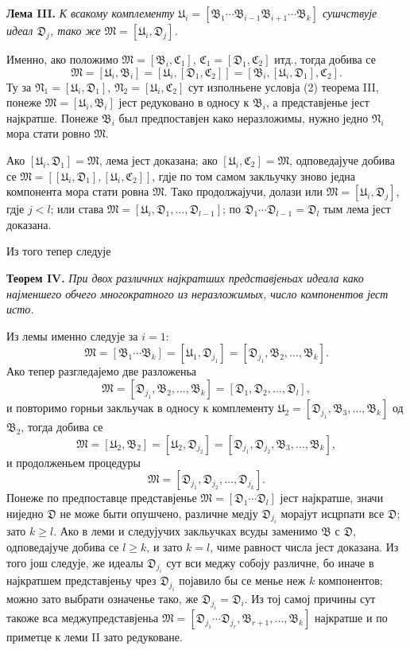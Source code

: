 ﻿\documentclass[11pt]{article}
\newcommand{\ideal}[1]{\mathfrak{#1}}
\begin{document}
\textbf{Лема III.} \emph{К всакому комплементу \(\ideal U_i=[\ideal B_1\cdots\ideal B_{i-1}\ideal B_{i+1}\cdots\ideal B_k]\) сушчствује идеал \(\ideal D_j\), тако же \(\ideal M=[\ideal U_i,\ideal D_j]\).}

Именно, ако положимо \(\ideal M=[\ideal B_i,\ideal C_1]\), \(\ideal C_1=[\ideal D_1,\ideal C_2]\) итд., тогда добива се
\[
 \ideal M=[\ideal U_i,\ideal B_i]=[\ideal U_i,[\ideal D_1,\ideal C_2]]=[\ideal B_i,[\ideal U_i,\ideal D_1],\ideal C_2].
\]
Ту за \(\ideal N_1=[\ideal U_i,\ideal D_1]\), \(\ideal N_2=[\ideal U_i,\ideal C_2]\) сут изполньене условја (2) теорема III, понеже \(\ideal M=[\ideal U_i,\ideal B_i]\) јест редуковано в односу к \(\ideal B_i\), а представјенье јест најкратше. Понеже \(\ideal B_i\) был предпоставјен како неразложимы, нужно једно \(\ideal N_i\) мора стати ровно \(\ideal M\).

Ако \([\ideal U_i,\ideal D_1]=\ideal M\), лема јест доказана; ако \([\ideal U_i,\ideal C_2]=\ideal M\), одповедајуче добива се \(\ideal M=[[\ideal U_i,\ideal D_1],[\ideal U_i,\ideal C_2]]\), гдје по том самом закльучку зново једна компонента мора стати ровна \(\ideal M\). Тако продолжајучи, долази или \(\ideal M=[\ideal U_i,\ideal D_j]\), гдје \(j<l\); или става \(\ideal M=[\ideal U_i,\ideal D_1,\ldots,\ideal D_{l-1}]\); по \(\ideal D_1\cdots\ideal D_{l-1}=\ideal D_l\) тым лема јест доказана.

Из того тепер следује

\textbf{Теорем IV.} \emph{При двох различних најкратших представјеньах идеала како најменшего обчего многократного из неразложимых, число компонентов јест исто.}

Из лемы именно следује за \(i=1\):
\[
 \ideal M=[\ideal B_1\cdots\ideal B_k]=[\ideal U_1,\ideal D_{j_1}]
 =[\ideal D_{j_1},\ideal B_2,\ldots,\ideal B_k].
\]
Ако тепер разгледајемо две разложеньа
\[
 \ideal M=[\ideal D_{j_1},\ideal B_2,\ldots,\ideal B_k]
          =[\ideal D_1,\ideal D_2,\ldots,\ideal D_l],
\]
и повторимо горньи закльучак в односу к комплементу \(\ideal U_2=[\ideal D_{j_1},\ideal B_3,\ldots,\ideal B_k]\) од \(\ideal B_2\), тогда добива се
\[
 \ideal M=[\ideal U_2,\ideal B_2]=[\ideal U_2,\ideal D_{j_2}]
          =[\ideal D_{j_1},\ideal D_{j_2},\ideal B_3,\ldots,\ideal B_k],
\]
и продолженьем процедуры
\[
 \ideal M=[\ideal D_{j_1},\ideal D_{j_2},\ldots,\ideal D_{j_k}].
\]
Понеже по предпоставце представјенье \(\ideal M=[\ideal D_1\cdots\ideal D_l]\) јест најкратше, значи ниједно \(\ideal D\) не може быти опушчено, различне медју \(\ideal D_{j_i}\) морајут исцрпати все \(\ideal D\); зато \(k\ge l\). Ако в леми и следујучих закльучках всуды заменимо \(\ideal B\) с \(\ideal D\), одповедајуче добива се \(l\ge k\), и зато \(k=l\), чиме равност числа јест доказана. Из того још следује, же идеалы \(\ideal D_{j_i}\) сут вси меджу собоју различне, бо иначе в најкратшем представјеньу чрез \(\ideal D_{j_i}\) појавило бы се менье неж \(k\) компонентов; можно зато выбрати означенье тако, же \(\ideal D_{j_i}=\ideal D_i\). Из тој самој причины сут такоже вса меджупредставјеньа \(\ideal M=[\ideal D_{j_1}\cdots\ideal D_{j_r},\ideal B_{r+1},\ldots,\ideal B_k]\) најкратше и по приметце к леми II зато редуковане.
\end{document}
